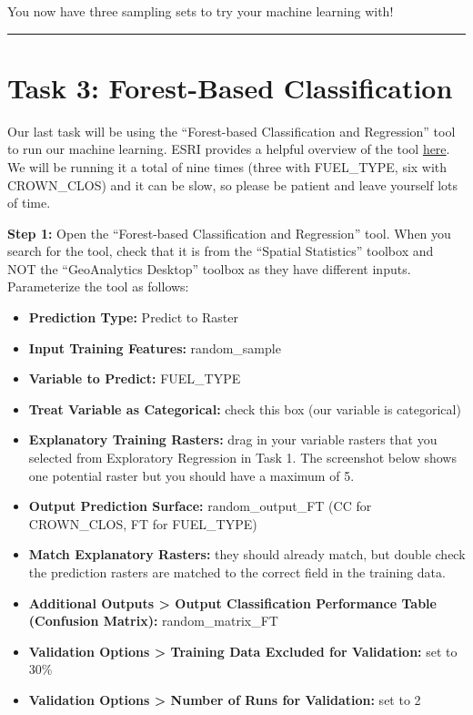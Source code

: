 \documentclass[
]{book}
\providecommand{\tightlist}{%
  \setlength{\itemsep}{0pt}\setlength{\parskip}{0pt}}
\begin{document}
You now have three sampling sets to try your machine learning with!

\begin{center}\rule{0.5\linewidth}{0.5pt}\end{center}

\hypertarget{task-3-forest-based-classification}{%
\section*{Task 3: Forest-Based Classification}\label{task-3-forest-based-classification}}

Our last task will be using the ``Forest-based Classification and Regression'' tool to run our machine learning. ESRI provides a helpful overview of the tool \href{https://pro.arcgis.com/en/pro-app/latest/tool-reference/spatial-statistics/how-forest-works.htm}{here}. We will be running it a total of nine times (three with FUEL\_TYPE, six with CROWN\_CLOS) and it can be slow, so please be patient and leave yourself lots of time.

\textbf{Step 1:} Open the ``Forest-based Classification and Regression'' tool. When you search for the tool, check that it is from the ``Spatial Statistics'' toolbox and NOT the ``GeoAnalytics Desktop'' toolbox as they have different inputs. Parameterize the tool as follows:

\begin{itemize}
\tightlist
\item
  \textbf{Prediction Type:} Predict to Raster
\item
  \textbf{Input Training Features:} random\_sample
\item
  \textbf{Variable to Predict:} FUEL\_TYPE
\item
  \textbf{Treat Variable as Categorical:} check this box (our variable is categorical)
\item
  \textbf{Explanatory Training Rasters:} drag in your variable rasters that you selected from Exploratory Regression in Task 1. The screenshot below shows one potential raster but you should have a maximum of 5.
\item
  \textbf{Output Prediction Surface:} random\_output\_FT (CC for CROWN\_CLOS, FT for FUEL\_TYPE)
\item
  \textbf{Match Explanatory Rasters:} they should already match, but double check the prediction rasters are matched to the correct field in the training data.
\item
  \textbf{Additional Outputs \textgreater{} Output Classification Performance Table (Confusion Matrix):} random\_matrix\_FT
\item
  \textbf{Validation Options \textgreater{} Training Data Excluded for Validation:} set to 30\%
\item
  \textbf{Validation Options \textgreater{} Number of Runs for Validation:} set to 2
\end{itemize}
\end{document}
